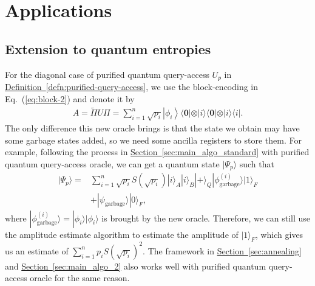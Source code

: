 \documentclass[journal]{IEEEtran}
\newcommand{\eq}[1]{Eq.~(\ref{eq:#1})}
\newcommand{\defn}[1]{\hyperref[defn:#1]{Definition~\ref*{defn:#1}}}
\renewcommand{\sec}[1]{\hyperref[sec:#1]{Section~\ref*{sec:#1}}}
\begin{document}

\section{Applications}\label{sec:applications}
\subsection{Extension to quantum entropies}
\noindent
For the diagonal case of purified quantum query-access $U_p$ in \defn{purified-query-access}, we use the block-encoding in \eq{block-2} and denote it by
\begin{align}
    A=\widetilde{\Pi} U \Pi =\sum_{i=1}^{n} \sqrt{p_{i}}\left|\phi_{i}\right\rangle\langle \mathbf{0}|\otimes| i\rangle\langle \mathbf{0}|\otimes| i\rangle\langle i|.
\end{align}
The only difference this new oracle brings is that the state we obtain may have some garbage states added, so we need some ancilla registers to store them. For example, following the process in \sec{main_algo_standard} with purified quantum query-access oracle, we can get a quantum state $|\Psi_p\rangle$ such that
\begin{align}
    |\Psi_{p}\rangle =  &\sum_{i=1}^{n} \sqrt{p_{i}} S\left(\sqrt{p_{i}}\right)|i\rangle_A|i\rangle_B|+\rangle_Q|\phi^{(i)}_{\mathrm{garbage}}\rangle|1\rangle_F \nonumber \\
    &+ |\psi_{\mathrm{garbage}}\rangle|0\rangle_F,
\end{align}
where $|\phi^{(i)}_{\mathrm{garbage}}\rangle = |\phi_i\rangle|\phi_i\rangle$ is brought by the new oracle. Therefore, we can still use the amplitude estimate algorithm to estimate the amplitude of $|1\rangle_F$, which gives us an estimate of $\sum_{i=1}^n p_i S(\sqrt{p_i})^2$. The framework in \sec{annealing} and \sec{main_algo_2} also works well with purified quantum query-access oracle for the same reason. 
\end{document}
